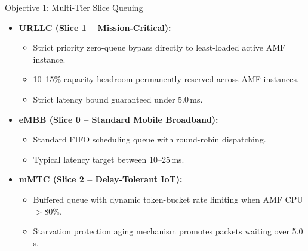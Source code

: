 \documentclass[aspectratio=169,11pt]{beamer}
\begin{document}
\begin{frame}{Objective 1: Multi-Tier Slice Queuing}
  \begin{itemize}
    \setlength\itemsep{1.3em}
    \item \textbf{URLLC (Slice 1 -- Mission-Critical):}
      \begin{itemize}
        \item Strict priority zero-queue bypass directly to least-loaded active AMF instance.
        \item 10--15\% capacity headroom permanently reserved across AMF instances.
        \item Strict latency bound guaranteed under 5.0\,ms.
      \end{itemize}
    \item \textbf{eMBB (Slice 0 -- Standard Mobile Broadband):}
      \begin{itemize}
        \item Standard FIFO scheduling queue with round-robin dispatching.
        \item Typical latency target between 10--25\,ms.
      \end{itemize}
    \item \textbf{mMTC (Slice 2 -- Delay-Tolerant IoT):}
      \begin{itemize}
        \item Buffered queue with dynamic token-bucket rate limiting when AMF CPU $> 80\%$.
        \item Starvation protection aging mechanism promotes packets waiting over 5.0\,s.
      \end{itemize}
  \end{itemize}
\end{frame}
\end{document}

